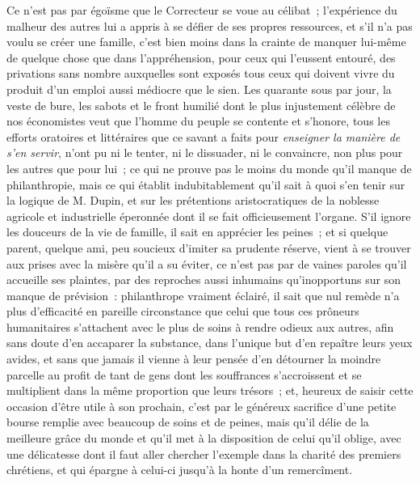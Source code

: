 \documentclass[french,twoside]{book} %
\begin{document}
Ce n’est pas par égoïsme que le Correcteur se voue au célibat ; l’expérience du malheur des autres lui a appris à se défier de ses propres ressources, et s’il n’a pas voulu se créer une famille, c’est bien moins dans la crainte de manquer lui-même de quelque chose que dans l’appréhension, pour ceux qui l’eussent entouré, des privations sans nombre auxquelles sont exposés tous ceux qui doivent vivre du produit d’un emploi aussi  médiocre que le sien. Les quarante sous par jour, la veste de bure, les sabots et le front humilié dont le plus injustement célèbre de nos économistes veut que l’homme du peuple se contente et s’honore, tous les efforts oratoires et littéraires que ce savant a faits pour \emph{enseigner la manière de s’en servir}, n’ont pu ni le tenter, ni le dissuader, ni le convaincre, non plus pour les autres que pour lui ; ce qui ne prouve pas le moins du monde qu’il manque de philanthropie, mais ce qui établit indubitablement qu’il sait à quoi s’en tenir sur la logique de M. Dupin, et sur les prétentions aristocratiques de la noblesse agricole et industrielle éperonnée dont il se fait officieusement l’organe. S’il ignore les douceurs de la vie de famille, il sait en apprécier les peines ; et si quelque parent, quelque ami, peu soucieux d’imiter sa prudente réserve, vient à se trouver aux prises avec la misère qu’il a su éviter,  ce n’est pas par de vaines paroles qu’il accueille ses plaintes, par des reproches aussi inhumains qu’inopportuns sur son manque de prévision : philanthrope vraiment éclairé, il sait que nul remède n’a plus d’efficacité en pareille circonstance que celui que tous ces prôneurs humanitaires s’attachent avec le plus de soins à rendre odieux aux autres, afin sans doute d’en accaparer la substance, dans l’unique but d’en repaître leurs yeux avides, et sans que jamais il vienne à leur pensée d’en détourner la moindre parcelle au profit de tant de gens dont les souffrances s’accroissent et se multiplient dans la même proportion que leurs trésors ; et, heureux de saisir cette occasion d’être utile à son prochain, c’est par le généreux sacrifice d’une petite bourse remplie avec beaucoup de soins et de peines, mais qu’il délie de la meilleure grâce du monde et qu’il met à la disposition de celui  qu’il oblige, avec une délicatesse dont il faut aller chercher l’exemple dans la charité des premiers chrétiens, et qui épargne à celui-ci jusqu’à la honte d’un remercîment.\par
\end{document}
